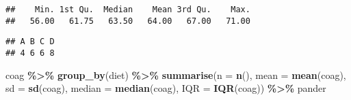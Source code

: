 \documentclass[
]{article}
\newenvironment{Shaded}{\begin{snugshade}}{\end{snugshade}}
\newcommand{\AttributeTok}[1]{\textcolor[rgb]{0.13,0.29,0.53}{#1}}
\newcommand{\FunctionTok}[1]{\textcolor[rgb]{0.13,0.29,0.53}{\textbf{#1}}}
\newcommand{\NormalTok}[1]{#1}
\newcommand{\SpecialCharTok}[1]{\textcolor[rgb]{0.81,0.36,0.00}{\textbf{#1}}}
\begin{document}
\begin{verbatim}
##    Min. 1st Qu.  Median    Mean 3rd Qu.    Max. 
##   56.00   61.75   63.50   64.00   67.00   71.00
\end{verbatim}

\begin{Shaded}
\end{Shaded}

\begin{verbatim}
## A B C D 
## 4 6 6 8
\end{verbatim}

\begin{Shaded}
\begin{Highlighting}[]
\NormalTok{    coag }\SpecialCharTok{\%\textgreater{}\%}
      \FunctionTok{group\_by}\NormalTok{(diet) }\SpecialCharTok{\%\textgreater{}\%}
      \FunctionTok{summarise}\NormalTok{(}\AttributeTok{n =} \FunctionTok{n}\NormalTok{(), }\AttributeTok{mean =} \FunctionTok{mean}\NormalTok{(coag), }\AttributeTok{sd =} \FunctionTok{sd}\NormalTok{(coag), }
      \AttributeTok{median =} \FunctionTok{median}\NormalTok{(coag), }\AttributeTok{IQR =} \FunctionTok{IQR}\NormalTok{(coag)) }\SpecialCharTok{\%\textgreater{}\%}\NormalTok{ pander}
\end{Highlighting}
\end{Shaded}
\end{document}
